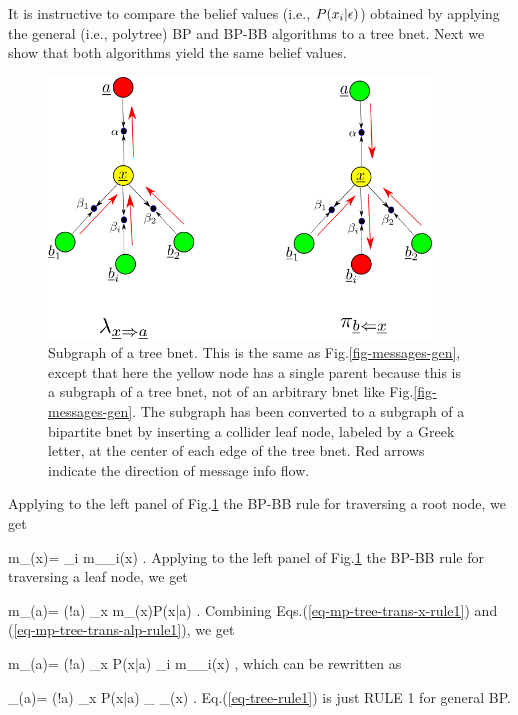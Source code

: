 It is instructive to 
compare the belief values (i.e., $P(x_i|\epsilon)$)
obtained by
 applying the 
general (i.e., polytree)  BP  
and  BP-BB algorithms  to a tree bnet.
Next we show that both algorithms 
yield the same belief values.

\begin{figure}[h!]
\centering
\includegraphics[width=4in]
{mpass/mpass-messages-bip-tree.png}
\caption{Subgraph of a tree bnet. 
This 
is the same as 
Fig.\ref{fig-messages-gen},
except that here the yellow
node has a single
parent because 
this is a subgraph of a tree
bnet, not
of an arbitrary
bnet like Fig.\ref{fig-messages-gen}.
The subgraph has been
converted to a subgraph
of a bipartite bnet
by inserting a collider leaf node, labeled
by a Greek letter, 
at the center
of each edge of the tree bnet.
Red arrows indicate
the direction
of message info flow.}
\label{fig-messages-bip-tree}
\end{figure}

Applying to the left panel of
Fig.\ref{fig-messages-bip-tree}
 the BP-BB rule
for traversing a root node, we get

\beq
m_{\alp\ldart \rvx}(x)=
\prod_{i}
m_{\beta_i\rdart \rvx}(x)
\;.
\label{eq-mp-tree-trans-x-rule1}
\eeq
Applying to the left panel of
Fig.\ref{fig-messages-bip-tree}
 the BP-BB rule
for traversing a leaf node, we get

\beq
m_{\alp\rdart\rva}(a)=
\caln(!a)
\sum_x
m_{\alp\ldart \rvx}(x)P(x|a)
\;.
\label{eq-mp-tree-trans-alp-rule1}
\eeq
Combining Eqs.(\ref{eq-mp-tree-trans-x-rule1})
and (\ref{eq-mp-tree-trans-alp-rule1}), we get

\beq
m_{\alp\rdart\rva}(a)=
\caln(!a)
\sum_x P(x|a)
\prod_{i}
m_{\beta_i\rdart \rvx}(x)
\;,
\eeq
which can be
rewritten as 

\beq
\lam_{\rvx\rdart\rva}(a)=
\caln(!a)
\sum_x P(x|a)
_
{\lam_\rvx(x)}
\;.
\label{eq-tree-rule1}
\eeq
Eq.(\ref{eq-tree-rule1}) is just RULE 1
for general BP.

